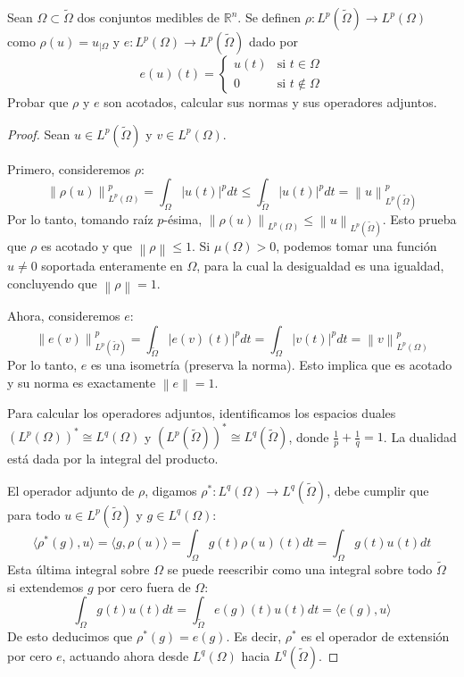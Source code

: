 \documentclass{article}
\theoremstyle{definition}
\newcommand{\R}{\mathbb{R}}
\newcommand{\norm}[1]{\left\lVert #1 \right\rVert}       %
\newenvironment{ejercicio}[1]{\begin{trivlist}
\item[\hskip \labelsep {\bfseries Ejercicio}\hskip \labelsep {\bfseries #1.}]}{\end{trivlist}}
\begin{document}
\begin{ejercicio}{3}
	Sean \( \Omega \subset \tilde{\Omega} \) dos conjuntos medibles de \( \R^{n} \). Se definen \( \rho:L^{p}(\tilde{\Omega})\rightarrow L^{p}(\Omega) \) como \( \rho(u)=u_{|\Omega} \) y \( e:L^{p}(\Omega)\rightarrow L^{p}(\tilde{\Omega}) \) dado por
	\[
		e(u)(t) =
		\begin{cases}
			u(t) & \text{si } t \in \Omega    \\
			0    & \text{si } t \notin \Omega
		\end{cases}
	\]
	Probar que \( \rho \) y \( e \) son acotados, calcular sus normas y sus operadores adjuntos.
\end{ejercicio}
\begin{proof}
	Sean \( u \in L^p(\tilde{\Omega}) \) y \( v \in L^p(\Omega) \).

	Primero, consideremos \( \rho \):
	\[ \norm{\rho(u)}_{L^p(\Omega)}^p = \int_{\Omega} |u(t)|^p dt \le \int_{\tilde{\Omega}} |u(t)|^p dt = \norm{ u }_{L^p(\tilde{\Omega})}^p \]
	Por lo tanto, tomando raíz \( p \)-ésima, \( \norm{\rho(u)}_{L^p(\Omega)} \le \norm{u}_{L^p(\tilde{\Omega})} \). Esto prueba que \( \rho \) es acotado y que \( \norm{\rho} \le 1 \). Si \( \mu(\Omega) > 0 \), podemos tomar una función \( u \neq 0 \) soportada enteramente en \( \Omega \), para la cual la desigualdad es una igualdad, concluyendo que \( \norm{\rho} = 1 \).

	Ahora, consideremos \( e \):
	\[ \norm{e(v)}_{L^p(\tilde{\Omega})}^p = \int_{\tilde{\Omega}} |e(v)(t)|^p dt = \int_{\Omega} |v(t)|^p dt = \norm{v}_{L^p(\Omega)}^p \]
	Por lo tanto, \( e \) es una isometría (preserva la norma). Esto implica que es acotado y su norma es exactamente \( \norm{e} = 1 \).

	Para calcular los operadores adjuntos, identificamos los espacios duales \( (L^p(\Omega))^* \cong L^q(\Omega) \) y \( (L^p(\tilde{\Omega}))^* \cong L^q(\tilde{\Omega}) \), donde \( \frac{1}{p} + \frac{1}{q} = 1 \). La dualidad está dada por la integral del producto.

	El operador adjunto de \( \rho \), digamos \( \rho^* : L^q(\Omega) \to L^q(\tilde{\Omega}) \), debe cumplir que para todo \( u \in L^p(\tilde{\Omega}) \) y \( g \in L^q(\Omega) \):
	\[ \langle \rho^*(g), u \rangle = \langle g, \rho(u) \rangle = \int_{\Omega} g(t) \rho(u)(t) dt = \int_{\Omega} g(t) u(t) dt \]
	Esta última integral sobre \( \Omega \) se puede reescribir como una integral sobre todo \( \tilde{\Omega} \) si extendemos \( g \) por cero fuera de \( \Omega \):
	\[ \int_{\Omega} g(t) u(t) dt = \int_{\tilde{\Omega}} e(g)(t) u(t) dt = \langle e(g), u \rangle \]
	De esto deducimos que \( \rho^*(g) = e(g) \). Es decir, \( \rho^* \) es el operador de extensión por cero \( e \), actuando ahora desde \( L^q(\Omega) \) hacia \( L^q(\tilde{\Omega}) \).


\end{proof}
\end{document}
